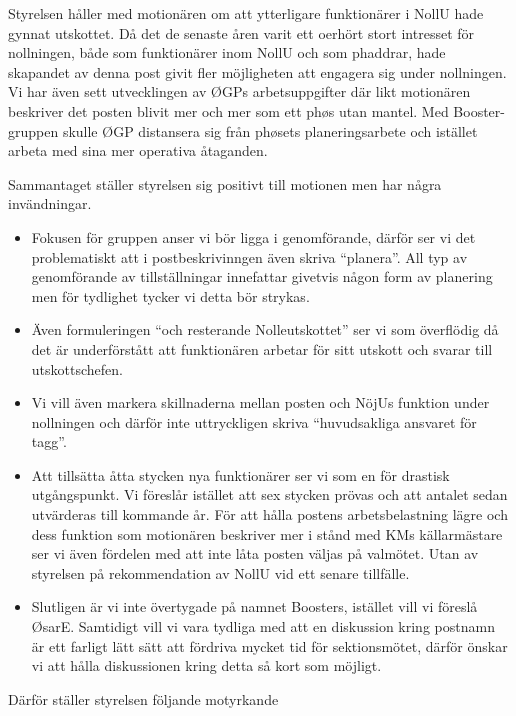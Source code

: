 \documentclass[../_main/handlingar.tex]{subfiles}
\begin{document}
\motionssvar

Styrelsen håller med motionären om att ytterligare funktionärer i NollU hade gynnat utskottet. 
Då det de senaste åren varit ett oerhört stort intresset för nollningen, både som funktionärer inom NollU och som phaddrar, hade skapandet av denna post givit fler möjligheten att engagera sig under nollningen. Vi har även sett utvecklingen av ØGPs arbetsuppgifter där likt motionären beskriver det posten blivit mer och mer som ett phøs utan mantel. Med Booster-gruppen skulle ØGP distansera sig från phøsets planeringsarbete och istället arbeta med sina mer operativa åtaganden. 

Sammantaget ställer styrelsen sig positivt till motionen men har några invändningar. 

\begin{itemize}
    \item Fokusen för gruppen anser vi bör ligga i genomförande, därför ser vi det problematiskt att i postbeskrivinngen även skriva “planera”. All typ av genomförande av tillställningar innefattar givetvis någon form av planering men för tydlighet tycker vi detta bör strykas. 
    \item Även formuleringen “och resterande Nolleutskottet” ser vi som överflödig då det är underförstått att funktionären arbetar för sitt utskott och svarar till utskottschefen. 
    \item Vi vill även markera skillnaderna mellan posten och NöjUs funktion under nollningen och därför inte uttryckligen skriva “huvudsakliga ansvaret för tagg”.
    \item Att tillsätta åtta stycken nya funktionärer ser vi som en för drastisk utgångspunkt. Vi föreslår istället att sex stycken prövas och att antalet sedan utvärderas till kommande år. För att hålla postens arbetsbelastning lägre och dess funktion som motionären beskriver mer i stånd med KMs källarmästare ser vi även fördelen med att inte låta posten väljas på valmötet. Utan av styrelsen på rekommendation av NollU vid ett senare tillfälle.
    \item Slutligen är vi inte övertygade på namnet Boosters, istället vill vi föreslå ØsarE. Samtidigt vill vi vara tydliga med att en diskussion kring postnamn är ett farligt lätt sätt att fördriva mycket tid för sektionsmötet, därför önskar vi att hålla diskussionen kring detta så kort som möjligt. 
\end{itemize}

Därför ställer styrelsen följande motyrkande
\end{document}
